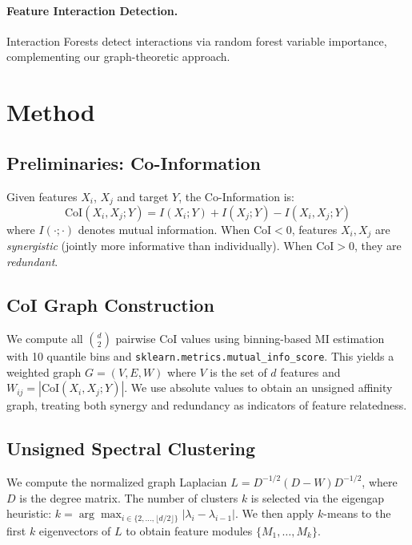 \documentclass[11pt,letterpaper]{article}
\begin{document}
\paragraph{Feature Interaction Detection.}
Interaction Forests \citep{Hornung2022} detect interactions via random forest variable importance, complementing our graph-theoretic approach.

\section{Method}

\subsection{Preliminaries: Co-Information}

Given features $X_i$, $X_j$ and target $Y$, the Co-Information is:
\begin{equation}
\text{CoI}(X_i, X_j; Y) = I(X_i; Y) + I(X_j; Y) - I(X_i, X_j; Y)
\end{equation}
where $I(\cdot;\cdot)$ denotes mutual information.
When $\text{CoI} < 0$, features $X_i, X_j$ are \emph{synergistic} (jointly more informative than individually).
When $\text{CoI} > 0$, they are \emph{redundant}.

\subsection{CoI Graph Construction}

We compute all $\binom{d}{2}$ pairwise CoI values using binning-based MI estimation with 10 quantile bins and \texttt{sklearn.metrics.mutual\_info\_score}.
This yields a weighted graph $G = (V, E, W)$ where $V$ is the set of $d$ features and $W_{ij} = |\text{CoI}(X_i, X_j; Y)|$.
We use absolute values to obtain an unsigned affinity graph, treating both synergy and redundancy as indicators of feature relatedness.

\subsection{Unsigned Spectral Clustering}

We compute the normalized graph Laplacian $L = D^{-1/2}(D - W)D^{-1/2}$, where $D$ is the degree matrix.
The number of clusters $k$ is selected via the eigengap heuristic: $k = \arg\max_{i \in \{2,\ldots,\lfloor d/2 \rfloor\}} |\lambda_i - \lambda_{i-1}|$.
We then apply $k$-means to the first $k$ eigenvectors of $L$ to obtain feature modules $\{M_1, \ldots, M_k\}$.
\end{document}
